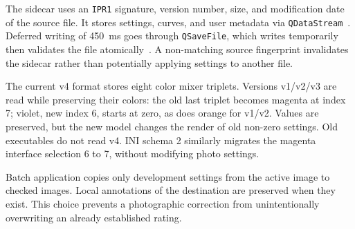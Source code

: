 The sidecar uses an \texttt{IPR1} signature, version number, size, and modification date of the source file. It stores settings, curves, and user metadata via \texttt{QDataStream}~\cite{qtQDataStream}. Deferred writing of 450~ms goes through \texttt{QSaveFile}, which writes temporarily then validates the file atomically~\cite{qtQSaveFile}. A non-matching source fingerprint invalidates the sidecar rather than potentially applying settings to another file.

The current v4 format stores eight color mixer triplets. Versions v1/v2/v3 are read while preserving their colors: the old last triplet becomes magenta at index 7; violet, new index 6, starts at zero, as does orange for v1/v2. Values are preserved, but the new model changes the render of old non-zero settings. Old executables do not read v4. INI schema 2 similarly migrates the magenta interface selection 6 to 7, without modifying photo settings.

Batch application copies only development settings from the active image to checked images. Local annotations of the destination are preserved when they exist. This choice prevents a photographic correction from unintentionally overwriting an already established rating.
